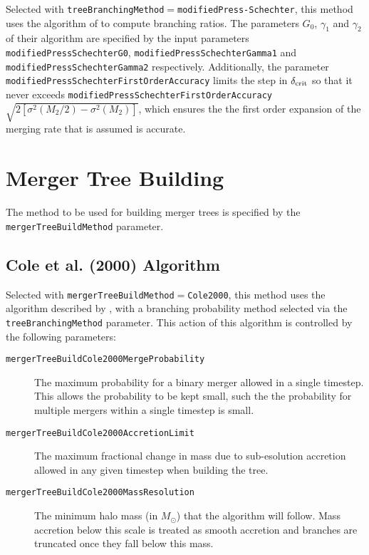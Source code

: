 Selected with {\tt treeBranchingMethod}$=${\tt modifiedPress-Schechter}, this method uses the algorithm of \cite{parkinson_generating_2008} to compute branching ratios. The parameters $G_0$, $\gamma_1$ and $\gamma_2$ of their algorithm are specified by the input parameters {\tt modifiedPressSchechterG0}, {\tt modifiedPressSchechterGamma1} and {\tt modifiedPressSchechterGamma2} respectively. Additionally, the parameter {\tt modifiedPressSchechterFirstOrderAccuracy} limits the step in $\delta_{\rm crit}$ so that it never exceeds {\tt modifiedPressSchechterFirstOrderAccuracy}$\sqrt{2[\sigma^2(M_2/2)-\sigma^2(M_2)]}$, which ensures the the first order expansion of the merging rate that is assumed is accurate.

\section{Merger Tree Building}

The method to be used for building merger trees is specified by the {\tt mergerTreeBuildMethod} parameter.

\subsection{Cole et al. (2000) Algorithm}

Selected with {\tt mergerTreeBuildMethod}$=${\tt Cole2000}, this method uses the algorithm described by \cite{cole_hierarchical_2000}, with a branching probability method selected via the {\tt treeBranchingMethod} parameter. This action of this algorithm is controlled by the following parameters:
\begin{description}
 \item [{\tt mergerTreeBuildCole2000MergeProbability}] The maximum probability for a binary merger allowed in a single timestep. This allows the probability to be kept small, such the the probability for multiple mergers within a single timestep is small.
 \item [{\tt mergerTreeBuildCole2000AccretionLimit}] The maximum fractional change in mass due to sub-esolution accretion allowed in any given timestep when building the tree.
 \item [{\tt mergerTreeBuildCole2000MassResolution}] The minimum halo mass (in $M_\odot$) that the algorithm will follow. Mass accretion below this scale is treated as smooth accretion and branches are truncated once they fall below this mass.
\end{description}

